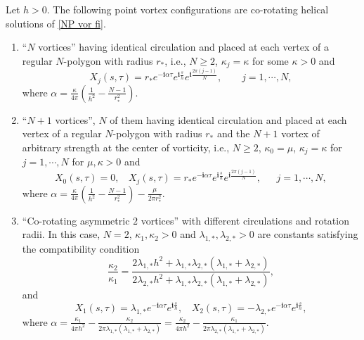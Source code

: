 \documentclass[12pt,reqno]{amsart}
\numberwithin{equation}{section}
\theoremstyle{definition}
\newenvironment{customthm}[1]
{\renewcommand\theinnercustomthm{#1}\innercustomthm}
{\endinnercustomthm}
\theoremstyle{remark}
\begin{document}
\begin{customthm}{A.1}  \label{lemA1}
Let $ h>0 $. The following point vortex configurations are co-rotating helical solutions of \eqref{NP vor fi}.
\begin{enumerate}
	\item[\textbf{Case 1:}]  ``$ N $ vortices'' having identical circulation and placed  at each vertex of a regular $ N $-polygon with radius $ r_* $, i.e., $ N\geq 2 $, $ \kappa_j=\kappa $ for some $ \kappa>0 $ and 
	\begin{equation*} 
	X_{j}(s,\tau)=r_*e^{-\mathbf{i}\alpha\tau}e^{\mathbf{i}\frac{s}{h}}e^{\mathbf{i}\frac{2\pi (j-1)}{N}},\ \ \ \ \ \ \ \ \  j=1,\cdots,N, 
	\end{equation*}
	where $ \alpha=\frac{\kappa}{4\pi}\left( \frac{1}{h^2}-\frac{N-1}{r_*^2}\right)  $.
	\item[\textbf{Case 2:}] ``$ N+1  $ vortices'', $ N $ of them having identical circulation and placed  at each vertex of a regular $ N $-polygon with radius $ r_* $ and the $ N +1 $ vortex of arbitrary strength
	at the center of vorticity, i.e., $ N\geq 2 $, $ \kappa_0=\mu $, $ \kappa_j=\kappa $ for $ j=1,\cdots,N $ for   $ \mu, \kappa>0 $  and
	\begin{equation*} 
	X_0(s,\tau)=0,\ \ \ \ X_{j}(s,\tau)=r_*e^{-\mathbf{i}\alpha\tau}e^{\mathbf{i}\frac{s}{h}}e^{\mathbf{i}\frac{2\pi (j-1)}{N}},\ \ \ \ \ \ \  j=1,\cdots,N,
	\end{equation*}
	where $ \alpha=\frac{\kappa}{4\pi}\left( \frac{1}{h^2}-\frac{N-1}{r_*^2}\right)-\frac{\mu}{2\pi r_*^2}  $.
		\item[\textbf{Case 3:}] ``Co-rotating asymmetric $ 2 $ vortices'' with different circulations and rotation radii. In this case, $ N= 2 $, $ \kappa_1,\kappa_2>0 $ and $ \lambda_{1,*},\lambda_{2,*}>0 $ are constants satisfying the compatibility condition
		\begin{equation*} 
		\frac{\kappa_2}{\kappa_1}=\frac{2\lambda_{1,*}h^2+\lambda_{1,*}\lambda_{2,*}(\lambda_{1,*}+\lambda_{2,*})}{2\lambda_{2,*}h^2+\lambda_{1,*}\lambda_{2,*}(\lambda_{1,*}+\lambda_{2,*})},
		\end{equation*}
		and
	\begin{equation*} 
	X_{1}(s,\tau)=\lambda_{1,*}e^{-\mathbf{i}\alpha\tau}e^{\mathbf{i}\frac{s}{h}},\ \ \ \ 	X_{2}(s,\tau)=-\lambda_{2,*}e^{-\mathbf{i}\alpha\tau}e^{\mathbf{i}\frac{s}{h}},
	\end{equation*}
	where $ \alpha=\frac{\kappa_1}{4\pi h^2}  -\frac{\kappa_2}{2\pi \lambda_{1,*}(\lambda_{1,*}+\lambda_{2,*})}=\frac{\kappa_2}{4\pi h^2}  -\frac{\kappa_1}{2\pi \lambda_{2,*}(\lambda_{1,*}+\lambda_{2,*})}  $.

\end{enumerate}
\end{customthm}
\end{document}
